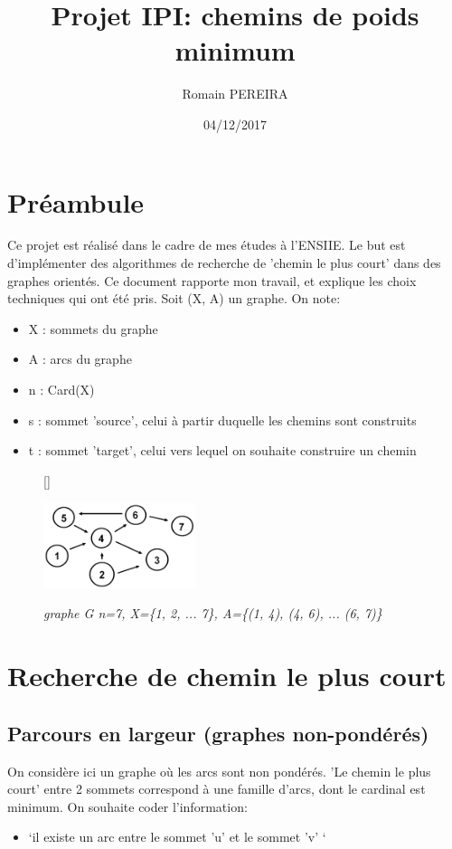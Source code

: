 \documentclass[10pt]{article}
\title{Projet IPI: chemins de poids minimum}
\author{Romain PEREIRA}
\date{04/12/2017}
\begin{document}
	\maketitle
	\tableofcontents

	\section*{Préambule}

		Ce projet est réalisé dans le cadre de mes études à l'ENSIIE. Le but est d'implémenter des
		algorithmes de recherche de 'chemin le plus court' dans des graphes orientés.
		Ce document rapporte mon travail, et explique les choix techniques qui ont été pris.
		Soit (X, A) un graphe. On note:
				
		\begin{itemize}[label=-]
			\setlength\itemsep{0.1em}
			\item X : sommets du graphe
			\item A : arcs du graphe
			\item n : Card(X)
			\item s : sommet 'source', celui à partir duquelle les chemins sont construits
			\item t : sommet 'target', celui vers lequel on souhaite construire un chemin
		\end{itemize}

		\begin{figure}
			[\FBwidth]
			{\caption{\textit{\newline graphe G n=7, \newline X=\{1, 2, ... 7\}, \newline A=\{(1, 4), (4, 6), ... (6, 7)\}}}
			\label{graphe}}
			{\includegraphics[height=2.5cm]{./images/graph.png}}
		\end{figure}

	\newpage
	\section{Recherche de chemin le plus court}
		\subsection{Parcours en largeur (graphes non-pondérés)}
			On considère ici un graphe où les arcs sont non pondérés. 'Le chemin le plus court'
			entre 2 sommets correspond à une famille d'arcs, dont le cardinal est minimum.
			On souhaite coder l'information:
			\begin{itemize}[label=-]
				\item `il existe un arc entre le sommet 'u' et le sommet 'v' `
			\end{itemize}
			
\end{document}
